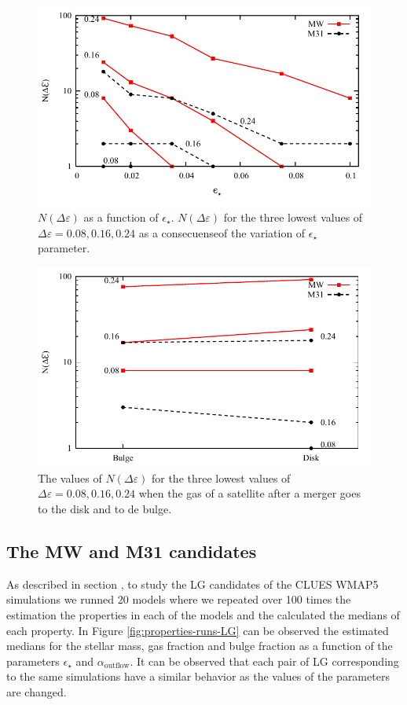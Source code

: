 \documentclass[usenatbib]{mn2e}
\begin{document}
\begin{figure}
\centering
\includegraphics[scale=0.68]{figures/chi-parameters/chi-squared-star-form-eff-v2.pdf} 
\caption{$N(\Delta\varepsilon)$ as a function of
  $\epsilon_{\star}$. $N(\Delta\varepsilon)$ for the three lowest
  values of $\Delta\varepsilon=0.08,0.16,0.24$ as a consecuenseof the
  variation of $\epsilon_{\star}$
  parameter. \label{fig:lg-chi-disk-star-eff}} 
\end{figure}


\begin{figure}
\centering
 \includegraphics[scale=0.68]{figures/chi-parameters/chi-squared-merger-ratio-v2.pdf}
\caption{The values of $N(\Delta\varepsilon)$  for the three lowest
  values of $\Delta\varepsilon=0.08,0.16,0.24$ when the gas of a
  satellite after a merger goes to the disk and to de
  bulge. \label{fig:lg-chi-gas-moves-to}} 
\end{figure}

\subsection{The MW and M31 candidates}
As described in section \label{sec:modeling-lg}, to study the LG
candidates of the CLUES WMAP5 simulations we runned 20 models where we
repeated over 100 times  the estimation the properties in each of the
models and the calculated the medians of each property. In Figure
\ref{fig:properties-runs-LG} can be observed the estimated medians for
the stellar mass, gas fraction and bulge fraction as a function of the
parameters $\epsilon_{\star}$ and $\alpha_{\text{outflow}}$. It can be
observed that each pair of LG corresponding to the same simulations
have a similar behavior as the values of the parameters are changed. 
\end{document}
